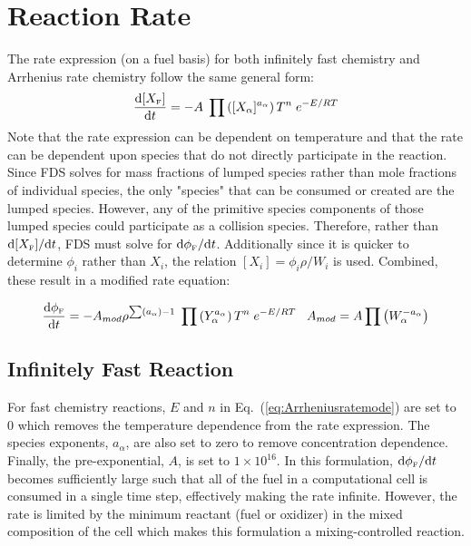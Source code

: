 \section{Reaction Rate} 

\label{Reaction_Rate_Model}

The rate expression (on a fuel basis) for both infinitely fast chemistry and Arrhenius rate chemistry follow the same general form:
\begin{equation}\label{eq:Arrheniusrateeqn}
\frac{\mbox{d}[X_{\tiny \hbox{F}}]}{\mbox{d}t} = -A \; \prod \left([X_{\alpha}]^{a_{\alpha}} \right) T^n \; e^{-E/RT} 
\end{equation}
Note that the rate expression can be dependent on temperature and that the rate can be dependent upon species that do not directly participate in the reaction. Since FDS solves for mass fractions of lumped species rather than mole fractions of individual species, the only "species" that can be consumed or created are the lumped species.  However, any of the primitive species components of those lumped species could participate as a collision species.  Therefore, rather than $\mbox{d}[X_{\tiny \hbox{F}}]/\mbox{d}t$,  FDS must solve for $\mbox{d}\phi_{\tiny \hbox{F}}/\mbox{d}t$.  Additionally since it is quicker to determine $\phi_i$ rather than $X_i$, the relation $[X_i]=\phi_i \rho/W_i$ is used.  Combined, these result in a modified rate equation:

\begin{equation}\label{eq:Arrheniusratemode}
\frac{\mbox{d}\phi_{\tiny \hbox{F}}}{\mbox{d}t} = -A_{mod} \rho^{\sum (a_{\alpha}) -1} \; \prod \left(Y_{\alpha}^{a_{\alpha}} \right) T^n \; e^{-E/RT} \;\;\; A_{mod} = A \prod \left(W_{\alpha}^{-a_{\alpha}} \right)  
\end{equation}

\subsection{Infinitely Fast Reaction}
For fast chemistry reactions, $E$ and $n$ in Eq.~(\ref{eq:Arrheniusratemode}) are set to $0$ which removes the temperature dependence from the rate expression. The species exponents, $a_{\alpha}$, are also set to zero to remove concentration dependence. Finally, the pre-exponential, $A$, is set to $1 \times 10^{16}$. In this formulation, $\mbox{d}\phi_{\tiny \hbox{F}}/\mbox{d}t$ becomes sufficiently large such that all of the fuel in a computational cell is consumed in a single time step, effectively making the rate infinite. However, the rate is limited by the minimum reactant (fuel or oxidizer) in the mixed composition of the cell which makes this formulation a mixing-controlled reaction.   

